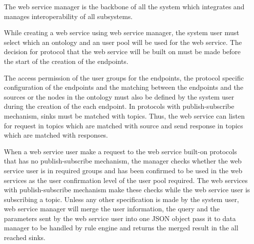 The web service manager is the backbone of all the system which integrates and manages interoperability of all subsystems.  

While creating a web service using web service manager, the system user must select which an ontology and an user pool will be used for the web service. The decision for protocol that the web service will be built on must be made before the start of the creation of the endpoints. 

The access permission of the user groups for the endpoints, the protocol specific configuration of the endpoints and the matching between the endpoints and the sources or the nodes in the ontology must also be defined by the system user during the creation of the each endpoint. In protocols with publish-subscribe mechanism, sinks must be matched with topics. Thus, the web service can listen for request in topics which are matched with source and send response in topics which are matched with responses.

When a web service user make a request to the web service built-on protocols that has no publish-subscribe mechanism, the manager checks whether the web service user is in required groups and has been confirmed to be used in the web services as the user confirmation level of the user pool required. The web services with publish-subscribe mechanism make these checks while the web service user is subscribing a topic. Unless any other specification is made by the system user, web service manager will merge the user information, the query and the parameters sent by the web service user into one JSON object pass it to data manager to be handled by rule engine and returns the merged result in the all reached sinks. 